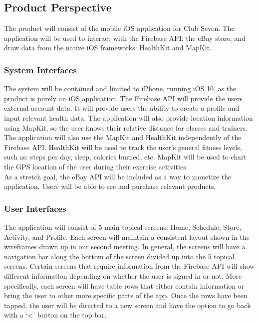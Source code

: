 \documentclass[letterpaper,10pt,titlepage]{article}
\begin{document}
\subsection{Product Perspective}

The product will consist of the mobile iOS application for Club Seven. The application will be used to interact with the Firebase API, the eBay store, and draw data from the native iOS frameworks: HealthKit and MapKit.

\subsubsection{System Interfaces}

The system will be contained and limited to iPhone, running iOS 10, as the product is purely an iOS application. The Firebase API will provide the users external account data. It will provide users the ability to create a profile and input relevant health data. The application will also provide location information using MapKit, so the user knows their relative distance for classes and trainers.\\

The application will also use the MapKit and HealthKit independently of the Firebase API. HealthKit will be used to track the user’s general fitness levels, such as: steps per day, sleep, calories burned, etc. MapKit will be used to chart the GPS location of the user during their exercise activities.\\

As a stretch goal, the eBay API will be included as a way to monetize the application. Users will be able to see and purchase relevant products.\\

\subsubsection{User Interfaces}

The application will consist of 5 main topical screens: Home, Schedule, Store, Activity, and Profile. Each screen will maintain a consistent layout shown in the wireframes drawn up in our second meeting. In general, the screens will have a navigation bar along the bottom of the screen divided up into the 5 topical screens. Certain screens that require information from the Firebase API will show different information depending on whether the user is signed in or not. More specifically, each screen will have table rows that either contain information or bring the user to other more specific parts of the app. Once the rows have been tapped, the user will be directed to a new screen and have the option to go back with a ‘<’ button on the top bar.\\
\end{document}
